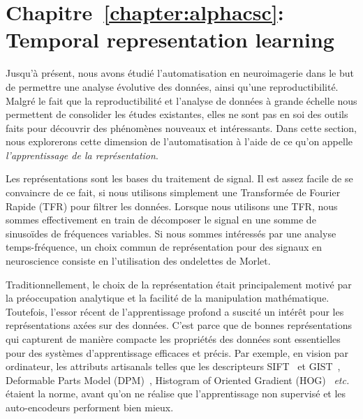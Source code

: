 \section*{Chapitre~\ref{chapter:alphacsc}: Temporal representation learning}

Jusqu'à présent, nous avons étudié l'automatisation en neuroimagerie dans le but de permettre une analyse évolutive des données, ainsi qu’une reproductibilité. Malgré le fait que la reproductibilité et l'analyse de données à grande échelle nous permettent de consolider les études existantes, elles ne sont pas en soi des outils faits pour découvrir des phénomènes nouveaux et intéressants. Dans cette section, nous explorerons cette dimension de l'automatisation à l'aide de ce qu'on appelle \emph{l'apprentissage de la représentation}.

Les représentations sont les bases du traitement de signal. Il est assez facile de se convaincre de ce fait, si nous utilisons simplement une Transformée de Fourier Rapide (TFR) pour filtrer les données. Lorsque nous utilisons une TFR, nous sommes effectivement en train de décomposer le signal en une somme de sinusoïdes de fréquences variables. Si nous sommes intéressés par une analyse temps-fréquence, un choix commun de représentation pour des signaux en neuroscience consiste en l’utilisation des ondelettes de Morlet.

Traditionnellement, le choix de la représentation était principalement motivé par la préoccupation analytique et la facilité de la manipulation mathématique. Toutefois, l'essor récent de l'apprentissage profond a suscité un intérêt pour les représentations axées sur des données. C'est parce que de bonnes représentations qui capturent de manière compacte les propriétés des données sont essentielles pour des systèmes d'apprentissage efficaces et précis. Par exemple, en vision par ordinateur, les attributs artisanals telles que les descripteurs SIFT~\citep{lowe1999object} et GIST~\citep{oliva2001modeling}, Deformable Parts Model (DPM)~\citep{felzenszwalb2010object}, Histogram of Oriented Gradient (HOG)~\citep{dalal2005histograms} \emph{etc.} étaient la norme, avant qu’on ne réalise que l'apprentissage non supervisé et les auto-encodeurs performent bien mieux.

